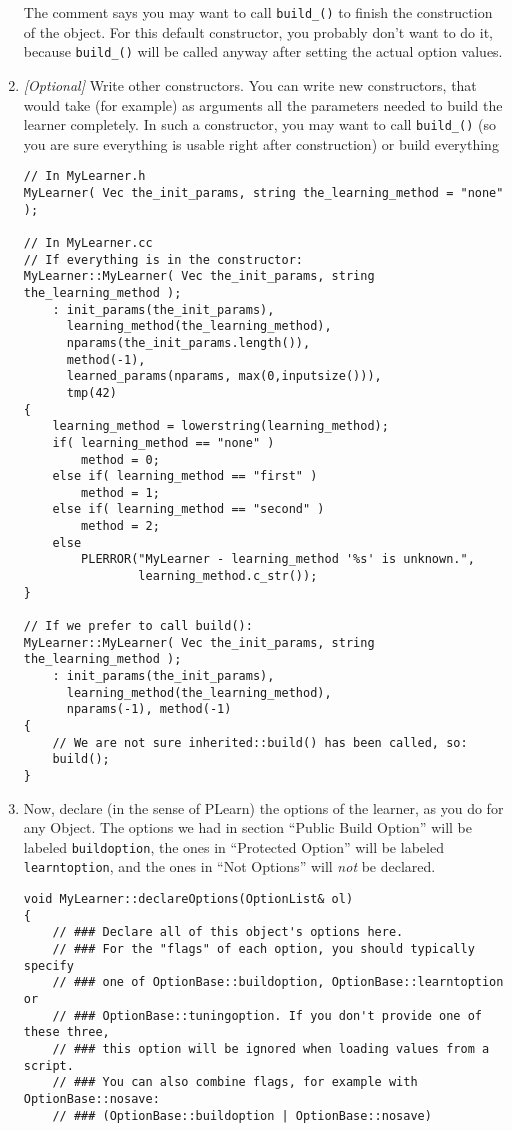 \documentclass[11pt]{book}
\begin{document}
\begin{enumerate}
The comment says you may want to call {\tt build\_()} to finish the
construction of the object. For this default constructor, you probably
don't want to do it, because {\tt build\_()} will be called anyway after
setting the actual option values.

\item {\em [Optional]} Write other constructors. You can write
new constructors, that would take (for example) as arguments all
the parameters needed to build the learner completely. In such a
constructor, you may want to call {\tt build\_()} (so you are sure
everything is usable right after construction) or build everything
\begin{verbatim}
// In MyLearner.h
MyLearner( Vec the_init_params, string the_learning_method = "none" );

// In MyLearner.cc
// If everything is in the constructor:
MyLearner::MyLearner( Vec the_init_params, string the_learning_method );
    : init_params(the_init_params),
      learning_method(the_learning_method),
      nparams(the_init_params.length()),
      method(-1),
      learned_params(nparams, max(0,inputsize())),
      tmp(42)
{
    learning_method = lowerstring(learning_method);
    if( learning_method == "none" )
        method = 0;
    else if( learning_method == "first" )
        method = 1;
    else if( learning_method == "second" )
        method = 2;
    else
        PLERROR("MyLearner - learning_method '%s' is unknown.",
                learning_method.c_str());
}

// If we prefer to call build():
MyLearner::MyLearner( Vec the_init_params, string the_learning_method );
    : init_params(the_init_params),
      learning_method(the_learning_method),
      nparams(-1), method(-1)
{
    // We are not sure inherited::build() has been called, so:
    build();
}
\end{verbatim}

\item Now, declare (in the sense of PLearn) the options of the learner,
as you do for any Object. The options we had in section ``Public Build
Option'' will be labeled {\tt buildoption}, the ones in ``Protected
Option'' will be labeled {\tt learntoption}, and the ones in ``Not
Options'' will {\em not} be declared.
\begin{verbatim}
void MyLearner::declareOptions(OptionList& ol)
{
    // ### Declare all of this object's options here.
    // ### For the "flags" of each option, you should typically specify
    // ### one of OptionBase::buildoption, OptionBase::learntoption or
    // ### OptionBase::tuningoption. If you don't provide one of these three,
    // ### this option will be ignored when loading values from a script.
    // ### You can also combine flags, for example with OptionBase::nosave:
    // ### (OptionBase::buildoption | OptionBase::nosave)


\end{verbatim}
\end{enumerate}
\end{document}

